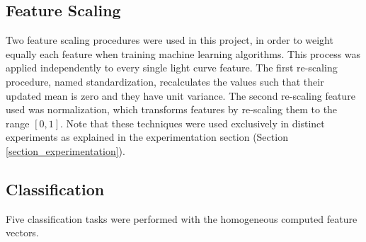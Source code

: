 \subsection{Feature Scaling} \label{subsection_scaling}
Two feature scaling procedures were used in this project, in order to weight equally each feature when training machine learning algorithms. This process was applied independently to every single light curve feature. The first re-scaling procedure, named standardization, recalculates the values such that their updated mean is zero and they have unit variance. The second re-scaling feature used was normalization, which transforms features by re-scaling them to the range $[0,1]$. Note that these techniques were used exclusively in distinct experiments as explained in the experimentation section (Section \ref{section_experimentation}).

\subsection{Classification} \label{subsection_classification}

Five classification tasks were performed with the homogeneous computed feature vectors.

